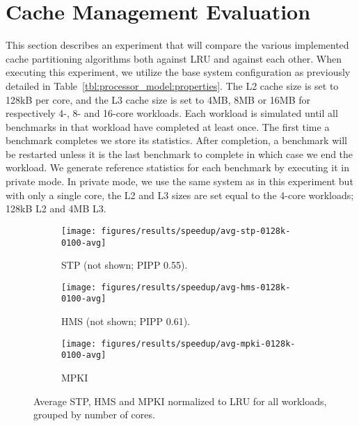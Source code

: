 
\section{Cache Management Evaluation}
\label{sec:results:cache_partition}

This section describes an experiment that will compare the various implemented cache partitioning algorithms both against LRU and against each other.
When executing this experiment, we utilize the base system configuration as previously detailed in Table~\ref{tbl:processor_model:properties}.
The L2 cache size is set to 128kB per core, and the L3 cache size is set to 4MB, 8MB or 16MB for respectively 4-, 8- and 16-core workloads.
Each workload is simulated until all benchmarks in that workload have completed at least once. 
The first time a benchmark completes we store its statistics.
After completion, a benchmark will be restarted unless it is the last benchmark to complete in which case we end the workload.
We generate reference statistics for each benchmark by executing it in private mode.
In private mode, we use the same system as in this experiment but with only a single core, the L2 and L3 sizes are set equal to the 4-core workloads; 128kB L2 and 4MB L3.

\begin{figure}[th]
    \centering
    \begin{subfigure}[b]{0.5\textwidth}
        \texttt{[image: figures/results/speedup/avg-stp-0128k-0100-avg]}
        \caption{STP (not shown; PIPP 0.55).}
        \label{fig:results:base:avg:stp}
    \end{subfigure}%
    \begin{subfigure}[b]{0.5\textwidth}
        \texttt{[image: figures/results/speedup/avg-hms-0128k-0100-avg]}
        \caption{HMS (not shown; PIPP 0.61).}
        \label{fig:results:base:avg:hms}
    \end{subfigure}
    \begin{subfigure}[b]{0.5\textwidth}
        \texttt{[image: figures/results/speedup/avg-mpki-0128k-0100-avg]}
        \caption{MPKI}
        \label{fig:results:base:avg:mpki}
    \end{subfigure}
    \caption[Average result grouped by core]{Average STP, HMS and MPKI normalized to LRU for all workloads, grouped by number of cores.}
    \label{fig:results:base:avg}
\end{figure}



